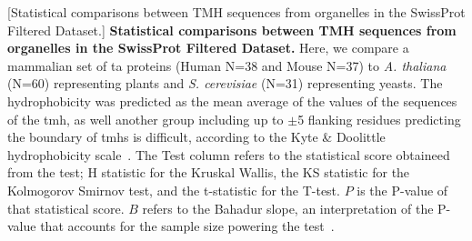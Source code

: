 \begin{table}[htbp]
\centering
{}[Statistical comparisons between TMH sequences from organelles in the SwissProt Filtered Dataset.]
{\textbf{Statistical comparisons between TMH sequences from organelles in the SwissProt Filtered Dataset.}
Here, we compare a mammalian set of \gls{ta} proteins (Human N=38 and Mouse N=37) to \textit{A. thaliana} (N=60) representing plants  and  \textit{S. cerevisiae} (N=31) representing yeasts.
The hydrophobicity was predicted as the mean average of the values of the sequences of the \gls{tmh}, as well another group including up to $\pm$5 flanking residues predicting the boundary of \gls{tmh}s is difficult, according to the Kyte \& Doolittle hydrophobicity scale~\cite{Kyte1982}.
The Test column refers to the statistical score obtaineed from the test; H statistic for the Kruskal Wallis, the KS statistic for the Kolmogorov Smirnov test, and the t-statistic for the T-test.
$P$ is the P-value of that statistical score.
$B$ refers to the Bahadur slope, an interpretation of the P-value that accounts for the sample size powering the test~\cite{Bahadur1967, Bahadur1971}.}
	\tiny


\end{table}
